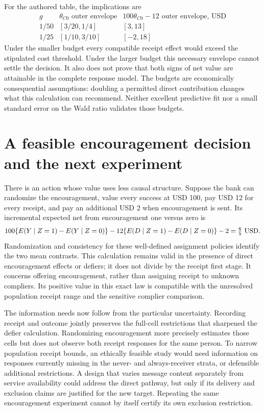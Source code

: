 For the authored table, the implications are
\[
\begin{array}{c|cc}
 g&\theta_{C0}\text{ outer envelope}
   &100\theta_{C0}-12\text{ outer envelope, USD}\\ \hline
 1/50&[3/20,1/4]&[3,13]\\
 1/25&[1/10,3/10]&[-2,18]
\end{array}
\]
Under the smaller budget every compatible receipt effect would exceed
the stipulated cost threshold. Under the larger budget this necessary
envelope cannot settle the decision. It also does not prove that both
signs of net value are attainable in the complete response model.
The budgets are economically consequential assumptions: doubling a
permitted direct contribution changes what this calculation can recommend.
Neither excellent predictive fit nor a small standard error on the
Wald ratio validates those budgets.

\section{A feasible encouragement decision and the next experiment}
\label{exec17:s3-sensitivity-decision}

There is an action whose value uses less causal structure. Suppose the
bank can randomize the encouragement, value every success at USD 100,
pay USD 12 for every receipt, and pay an additional USD 2 when
encouragement is sent. Its incremental expected net from encouragement
one versus zero is
\[
 100\{E(Y\mid Z=1)-E(Y\mid Z=0)\}
 -12\{E(D\mid Z=1)-E(D\mid Z=0)\}-2
 =\tfrac65\ {\rm USD}.
\]
Randomization and consistency for these well-defined assignment policies
identify the two mean contrasts. This calculation remains valid in
the presence of direct encouragement effects or defiers; it does not
divide by the receipt first stage. It concerns offering encouragement,
rather than assigning receipt to unknown compliers. Its positive value
in this exact law is compatible with the unresolved population receipt
range and the sensitive complier comparison.

The information needs now follow from the particular uncertainty.
Recording receipt and outcome jointly preserves the full-cell restrictions
that sharpened the defier calculation. Randomizing encouragement more
precisely estimates those cells but does not observe both receipt
responses for the same person. To narrow population receipt bounds, an
ethically feasible study would need information on responses currently
missing in the never- and always-receiver strata, or defensible additional
restrictions. A design that varies message content separately from service
availability could address the direct pathway, but only if its delivery
and exclusion claims are justified for the new target. Repeating the
same encouragement experiment cannot by itself certify its own exclusion
restriction.

